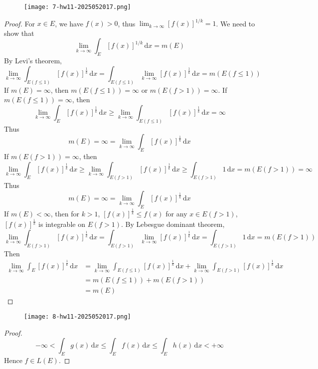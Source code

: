\begin{exercise}
\begin{figure}[H]
\centering
\texttt{[image: 7-hw11-2025052017.png]}
\label{}
\end{figure}
\end{exercise}
\begin{proof}
For $x\in E$, we have $f(x)>0$, thus $\lim_{ k \to \infty }[f(x)]^{1/k}=1$. We need to show that
\[
\lim_{ k \to \infty } \int_{E}^{} [f(x)]^{1/k } \, \mathrm{d}x =m(E)
\]
By Levi's theorem,
\[
\lim_{ k \to \infty } \int_{E(f\leq 1)}^{} [f(x)]^{\frac{1}{k}} \, \mathrm{d}x =\int_{E(f\leq 1)}^{} \lim_{ k \to \infty } [f(x)]^{\frac{1}{k}} \, \mathrm{d}x=m(E(f\leq 1))
\]
If $m(E)=\infty$, then $m(E(f\leq1))=\infty$ or $m(E(f>1))=\infty$. If $m(E(f\leq1))=\infty$, then
\[
\lim_{ k \to \infty } \int_{E}^{} [f(x)]^{\frac{1}{k}} \, \mathrm{d}x \geq \lim_{ k \to \infty } \int_{E(f\leq 1)}^{} [f(x)]^{\frac{1}{k}} \, \mathrm{d}x =\infty
\]
Thus
\[
m(E)=\infty=\lim_{ k \to \infty } \int_{E}^{} [f(x)]^{\frac{1}{k}} \, \mathrm{d}x
\]
If $m(E(f>1))=\infty$, then
\[
\lim_{ k \to \infty } \int_{E}^{} [f(x)]^{\frac{1}{k}} \, \mathrm{d}x \geq \lim_{ k \to \infty } \int_{E(f>1)}^{} [f(x)]^{\frac{1}{k}} \, \mathrm{d}x \geq \int_{E(f>1)}^{} 1 \, \mathrm{d}x =m(E(f>1))=\infty
\]
Thus
\[
m(E)=\infty=\lim_{ k \to \infty } \int_{E}^{} [f(x)]^{\frac{1}{k}} \, \mathrm{d}x
\]
If $m(E)<\infty$, then for $k>1$, $[f(x)]^{\frac{1}{k}}\leq f(x)$ for any $x\in E(f>1)$, $[f(x)]^{\frac{1}{k}}$ is integrable on $E(f>1)$. By Lebesgue dominant theorem,
\[
\lim_{ k \to \infty } \int_{E(f>1)}^{} [f(x)]^{\frac{1}{k}} \, \mathrm{d}x =\int_{E(f>1)}^{} \lim_{ k \to \infty } [f(x)]^{\frac{1}{k}} \, \mathrm{d}x =\int_{E(f>1)}^{} 1 \, \mathrm{d}x =m(E(f>1))
\]
Then
\[
\begin{aligned}
\lim_{ k \to \infty } \int_{E}^{} [f(x)]^{\frac{1}{k}} \, \mathrm{d}x  & =\lim_{ k \to \infty } \int_{E(f\leq 1)}^{} [f(x)]^{\frac{1}{k}} \, \mathrm{d}x +\lim_{ k \to \infty } \int_{E(f>1)}^{} [f(x)]^{\frac{1}{k}} \, \mathrm{d}x  \\
 & =m(E(f\leq 1))+m(E(f>1)) \\
 & =m(E)
\end{aligned}
\]
\end{proof}

\begin{exercise}
\begin{figure}[H]
\centering
\texttt{[image: 8-hw11-2025052017.png]}
\label{}
\end{figure}
\end{exercise}
\begin{proof}
\[
-\infty<\int_{E}^{} g(x) \, \mathrm{d}x \leq \int_{E}^{} f(x) \, \mathrm{d}x \leq \int_{E}^{} h(x) \, \mathrm{d}x <+\infty
\]
Hence $f\in L(E)$.
\end{proof}

